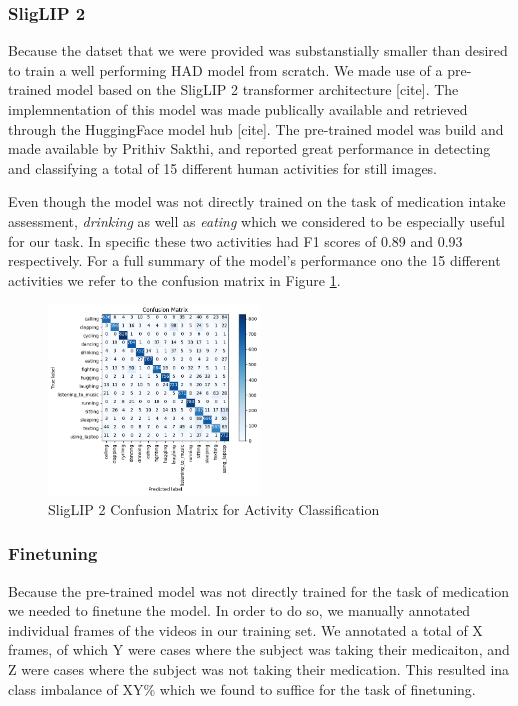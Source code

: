 \documentclass[a4paper,12pt]{article}
\begin{document}
\subsubsection{SligLIP 2}
Because the datset that we were provided was substanstially smaller than desired to train
a well performing HAD model from scratch. We made use of a pre-trained model based on the SligLIP 2 
transformer architecture [cite]. The implemnentation of this model was made publically available and
retrieved through the HuggingFace model hub [cite]. The pre-trained model was build and 
made available by Prithiv Sakthi, and reported great performance in detecting and classifying
a total of 15 different human activities for still images. 

Even though the model was not directly trained on the task of medication intake assessment,
\textit{drinking} as well as \textit{eating} which we considered to be especially useful for our task. 
In specific these two activities had F1 scores of 0.89 and 0.93 respectively. For a full summary of the 
model's performance ono the 15 different activities we refer to the confusion matrix in Figure 
\ref{fig:HAD-cm}.

\begin{figure}[H]
    \centering
    \includegraphics[width=0.5\textwidth]{./images/conf matrix had.png} %
    \caption{SligLIP 2 Confusion Matrix for Activity Classification}
    \label{fig:HAD-cm}
\end{figure}

\subsubsection{Finetuning}
Because the pre-trained model was not directly trained for the task of medication 
we needed to finetune the model. In order to do so, we manually annotated individual 
frames of the videos in our training set. We annotated a total of X frames, of which
Y were cases where the subject was taking their medicaiton, and Z were cases where
the subject was not taking their medication. This resulted ina class imbalance of 
XY\% which we found to suffice for the task of finetuning. 
\end{document}

